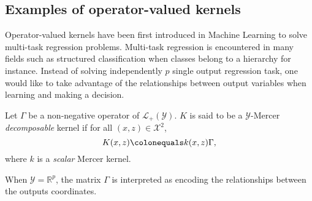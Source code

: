 \subsection{Examples of operator-valued kernels}
\label{subsec:ovk-ex}
Operator-valued kernels have been first introduced in Machine Learning to solve multi-task regression problems. Multi-task regression is encountered in many fields such as structured classification when classes belong to a hierarchy for instance. Instead of solving independently $p$ single output regression task, one would like to take advantage of the relationships between output variables when learning and making a decision.
\begin{definition}
\label{dec-kernel}
Let $\Gamma$ be a non-negative operator of $\mathcal{L}_+(\mathcal{Y})$. $K$ is said to be a $\mathcal{Y}$-Mercer \emph{decomposable} kernel if for all $(x,z) \in \mathcal{X}^2$,
\begin{dmath*}
K(x,z) \colonequals k(x,z)\Gamma,
\end{dmath*}
where $k$ is a \emph{scalar} Mercer kernel.
\end{definition}
When $\mathcal{Y}=\mathbb{R}^p$, the matrix $\Gamma$ is interpreted as encoding the relationships between the outputs coordinates.
